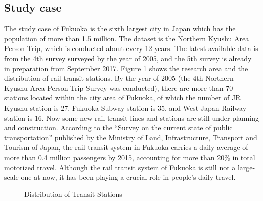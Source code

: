 \documentclass[sustainability,article,submit,moreauthors,pdftex,10pt,a4paper]{Definitions/mdpi}
\begin{document}
\subsection{Study case}
The study case of Fukuoka is the sixth largest city in Japan which has the population of more than 1.5 million. The dataset is the Northern Kyushu Area Person Trip, which is conducted about every 12 years. The latest available data is from the 4th survey surveyed by the year of 2005, and the 5th survey is already in preparation from September 2017. Figure \ref{fig:StationDistribution} shows the research area and the distribution of rail transit stations. By the year of 2005 (the 4th Northern Kyushu Area Person Trip Survey was conducted), there are more than 70 stations located within the city area of Fukuoka, of which the number of JR Kyushu station is 27, Fukuoka Subway station is 35, and West Japan Railway station is 16. Now some new rail transit lines and stations are still under planning and construction. According to the “Survey on the current state of public transportation” published by the Ministry of Land, Infrastructure, Transport and Tourism of Japan, the rail transit system in Fukuoka carries a daily average of more than 0.4 million passengers by 2015, accounting for more than 20\% in total motorized travel. Although the rail transit system of Fukuoka is still not a large-scale one at now, it has been playing a crucial role in people's daily travel.

%
\begin{figure}[h]
	\caption{Distribution of Transit Stations}
	\label{fig:StationDistribution}
	\centering
\end{figure}
\end{document}
